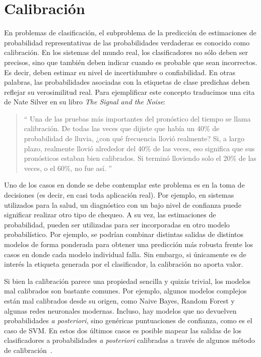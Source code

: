 \chapter{Calibración}\label{appendix:calibracion}

En problemas de clasificación, el subproblema de la predicción de estimaciones
de probabilidad representativas de las probabilidades verdaderas es conocido
como calibración. En los sistemas del mundo real, los clasificadores no sólo
deben ser precisos, sino que también deben indicar cuando es probable que sean
incorrectos. Es decir, deben estimar su nivel de incertidumbre o confiabilidad.
En otras palabras, las probabilidades asociadas con la etiquetas de clase
predichas deben reflejar su verosimilitud real. Para ejemplificar este concepto
traducimos una cita de Nate Silver en su libro {\it The Signal and the Noise\/}:  

\begin{quote}
`` Una de las pruebas más importantes del pronóstico del tiempo se llama
   calibración. De todas las veces que dijiste que había un 40\% de probabilidad
   de lluvia, ¿con qué frecuencia llovió realmente? Si, a largo plazo, realmente
   llovió alrededor del 40\% de las veces, eso significa que sus pronósticos
   estaban bien calibrados. Si terminó lloviendo solo el 20\% de las veces, o el
   60\%, no fue así. ''
\end{quote}

Uno de los casos en donde se debe contemplar este problema es en la toma de
decisiones (es decir, en casi toda aplicación real). Por ejemplo, en sistemas
utilizados para la salud, un diagnóstico con un bajo nivel de confianza puede
significar realizar otro tipo de chequeo. A su vez, las estimaciones de
probabilidad, pueden ser utilizadas para ser incorporadas en otro modelo
probabilístico. Por ejemplo, se podrían combinar distintas salidas de distintos
modelos de forma ponderada para obtener una predicción más robusta frente los
casos en donde cada modelo individual falla. Sin embargo, si únicamente es de
interés la etiqueta generada por el clasificador, la calibración no aporta
valor.

Si bien la calibración parece una propiedad sencilla y quizás trivial, los
modelos mal calibrados son bastante comunes. Por ejemplo, algunos modelos
complejos están mal calibrados desde su origen, como Naive Bayes, Random Forest
y algunas redes neuronales modernas. Incluso, hay modelos que no devuelven
probabilidades {\it a posteriori}, sino genéricas puntuaciones de confianza,
como es el caso de SVM. En estos dos últimos casos es posible mapear las salidas
de los clasificadores a probabilidades {\it a posteriori\/} calibradas a través
de algunos método de calibración~\cite{platt1999probabilistic,
zadrozny2002transforming, niculescu2005predicting, guo2017calibration}.

